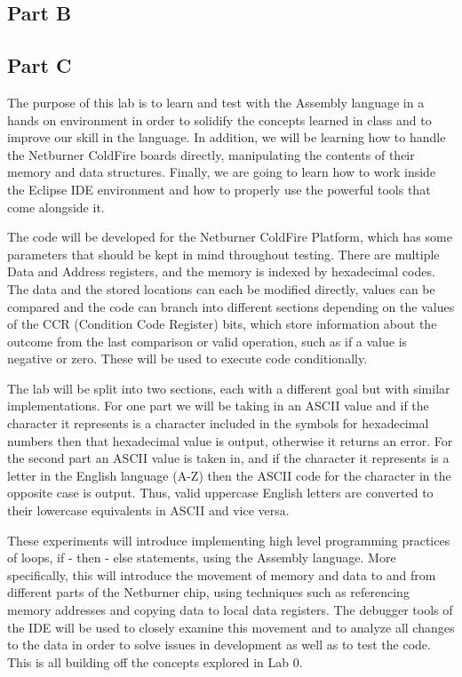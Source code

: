 \documentclass[letterpaper]{article}
\begin{document}
  \subsection{Part B}
  \subsection{Part C}

  The purpose of this lab is to learn and test with the Assembly language in a hands on environment
  in order to solidify the concepts learned in class and to improve our skill in the language.  In
  addition, we will be learning how to handle the Netburner ColdFire boards directly, manipulating
  the contents of their memory and data structures.  Finally, we are going to learn how to work inside
  the Eclipse IDE environment and how to properly use the powerful tools that come alongside it.



  The code will be developed for the Netburner ColdFire Platform, which has some parameters that should
  be kept in mind throughout testing.  There are multiple Data and Address registers, and the memory
  is indexed by hexadecimal codes.  The data and the stored locations can each be modified directly, values
  can be compared and the code can branch into different sections depending on the values of the CCR
  (Condition Code Register) bits,
  which store information about the outcome from the last comparison or valid operation, such as if a
  value is negative or zero.  These will be used to execute code conditionally.

  The lab will be split into two sections, each with a different goal but with similar implementations.
  For one part we will be taking in an ASCII value and if the character it represents is a character
  included in the symbols for hexadecimal numbers then that hexadecimal value is output, otherwise
  it returns an error.  For the second part an ASCII value is taken in, and if the character it represents
  is a letter in the English language (A-Z) then the ASCII code for the character in the opposite case
  is output.  Thus, valid uppercase English letters are converted to their lowercase equivalents in ASCII
  and vice versa.


  These experiments will introduce implementing high level programming practices of loops, if - then - else statements,
  using the Assembly language. More specifically, this will introduce the movement of
  memory and data to and from different parts of the Netburner chip, using techniques such as referencing
  memory addresses and copying data to local data registers.  The debugger tools of the IDE will be used
  to closely examine this movement and to analyze all changes to the data in order to solve issues in
  development as well as to test the code.  This is all building off the concepts explored in Lab 0.
\end{document}
